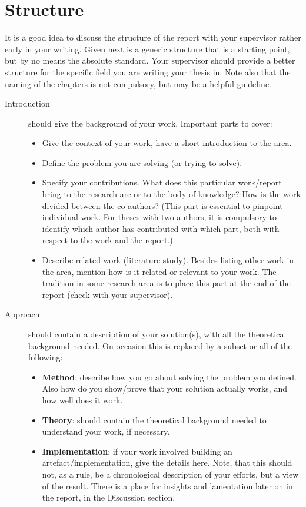 \documentclass{cslthse-msc}
\begin{document}
\chapter{Structure}
It is a good idea to discuss the structure of the report with your supervisor rather early in your writing. Given next is a generic structure that is a starting point, but by no means the absolute standard. Your supervisor should provide a better structure for the specific field you are writing your thesis in. Note also that the naming of the chapters is not compulsory, but may be a helpful guideline.
\begin{description}
\item[Introduction] should give the background of your work. Important parts to cover:
\begin{itemize}
\item Give the context of your work, have a short introduction to the area.
\item Define the problem you are solving (or trying to solve).
\item Specify your contributions. What does this particular work/report bring to the research are or to the body of knowledge? How is the work divided between the co-authors? (This part is essential to pinpoint individual work. For theses with two authors, it is compulsory to identify which author has contributed with which part, both with respect to the work and the report.)
\item Describe related work (literature study). Besides listing other work in the area, mention how is it related or relevant to your work. The tradition in some research area is to place this part at the end of the report (check with your supervisor).
\end{itemize}
\item[Approach] should contain a description of your solution(s), with all the theoretical background needed. On occasion this is replaced by a subset or all of the following:
\begin{itemize}
\item \textbf{Method}: describe how you go about solving the problem you defined. Also how do you show/prove that your solution actually works, and how well does it work.
\item \textbf{Theory}: should contain the theoretical background needed to understand your work, if necessary.
\item \textbf{Implementation}: if your work involved building an artefact/implementation, give the details here. Note, that this should not, as a rule, be a chronological description of your efforts, but a view of the result. There is a place for insights and lamentation later on in the report, in the Discussion section.

\end{itemize}
\end{description}
\end{document}
